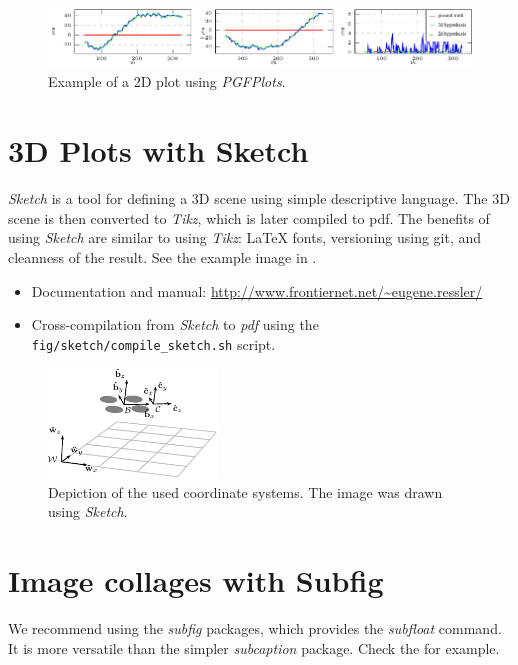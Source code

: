 \begin{figure}[!h]
  \centering
  \includegraphics[width=1.0\textwidth]{./fig/plots/example_plot/hypotheses.pdf}
  \caption{Example of a 2D plot using \emph{PGFPlots}.}
  \label{fig:pgfplots}
\end{figure}

\section{3D Plots with Sketch}

\emph{Sketch} is a tool for defining a 3D scene using simple descriptive language.
The 3D scene is then converted to \emph{Tikz}, which is later compiled to pdf.
The benefits of using \emph{Sketch} are similar to using \emph{Tikz}: LaTeX fonts, versioning using git, and cleanness of the result.
See the example image in .
\begin{itemize}
  \item Documentation and manual: \url{http://www.frontiernet.net/~eugene.ressler/}
  \item Cross-compilation from \emph{Sketch} to \emph{pdf} using the \texttt{fig/sketch/compile\_sketch.sh} script.
\end{itemize}

\begin{figure}[!h]
  \centering
  \includegraphics[width=0.4\textwidth]{./fig/sketch/coordinate_frames.pdf}
  \caption{Depiction of the used coordinate systems. The image was drawn using \emph{Sketch}.}
  \label{fig:coordinate_systems}
\end{figure}

\section{Image collages with Subfig}

We recommend using the \emph{subfig} packages, which provides the \emph{subfloat} command.
It is more versatile than the simpler \emph{subcaption} package.
Check the  for example.

